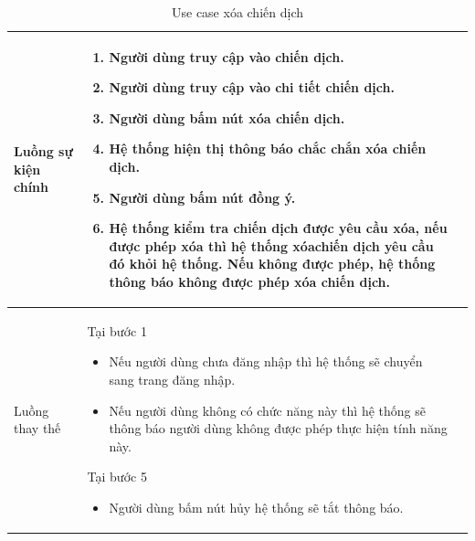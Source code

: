 \documentclass[12pt,a4paper]{article}
\begin{document}
\begin{table}[H]
\begin{tabular}{|p{3.5cm}|p{11.5cm}|c|}
            Luồng sự kiện chính & \vspace{-.8cm}\begin{enumerate}
                                                    \item Người dùng truy cập vào chiến dịch.
                                                    \item Người dùng truy cập vào chi tiết chiến dịch.
                                                    \item  Người dùng bấm nút xóa chiến dịch.
                                                    \item  Hệ thống hiện thị thông báo chắc chắn xóa chiến dịch.
                                                    \item  Người dùng bấm nút đồng ý.
                                                    \item Hệ thống kiểm tra chiến dịch được yêu cầu xóa, nếu được phép xóa thì hệ thống xóachiến dịch yêu cầu đó khỏi hệ thống. Nếu không được phép, hệ thống thông báo không được phép xóa chiến dịch.
            \end{enumerate}
            \\
            \hline
            Luồng thay thế & Tại bước 1\newline
            \vspace{-.8cm}\begin{itemize}
                              \item Nếu người dùng chưa đăng nhập thì hệ thống sẽ chuyển sang trang đăng nhập.
                              \item Nếu người dùng không có chức năng này thì hệ thống sẽ thông báo người dùng không được phép thực hiện tính năng này.
            \end{itemize}

            Tại bước 5\newline
            \vspace{-.8cm}\begin{itemize}
                              \item Người dùng bấm nút hủy hệ thống sẽ tắt thông báo.
            \end{itemize} \\
            \hline
        \end{tabular}
        \caption{Use case xóa chiến dịch}

    \end{table}
\end{document}
